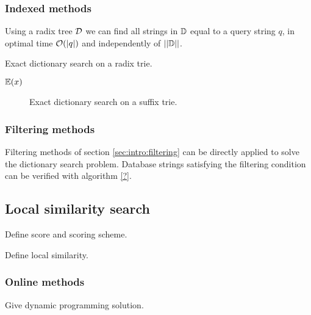 \subsubsection{Indexed methods}

Using a radix tree $\mathcal {D}$ we can find all strings in $\mathbb {D}$ equal to a query string $q$, in optimal time $\mathcal{O}(|q|)$ and independently of $||\mathbb {D}||$.

\begin{algorithm}[h]
\caption{Exact dictionary search on a radix trie.}
\label{alg:dict-exact}
\begin{algorithmic}[1]
		\State \Report $\mathbb {E}(x)$
		\State {}
	\EndIf
\EndProcedure
\end{algorithmic}
\end{algorithm}

\begin{figure}[h]
\begin{center}
\caption{Exact dictionary search on a suffix trie.}
\label{fig:dict-exact}

\end{center}
\end{figure}

\subsubsection{Filtering methods}

Filtering methods of section \ref{sec:intro:filtering} can be directly applied to solve the dictionary search problem. Database strings satisfying the filtering condition can be verified with algorithm \ref{?}.




\subsection{Local similarity search}

Define score and scoring scheme.

Define local similarity.

\subsubsection{Online methods}
Give dynamic programming solution.

